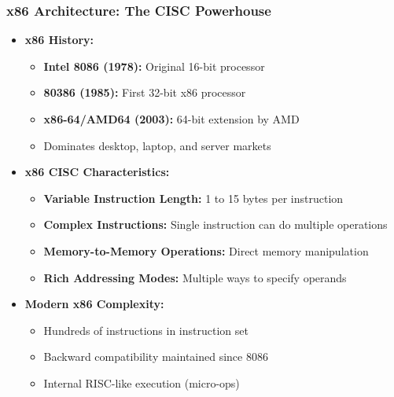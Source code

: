 \begin{frame}
\frametitle{x86 Architecture: The CISC Powerhouse}
\begin{itemize}
    \item \textbf{x86 History:}
    \begin{itemize}
        \item \textbf{Intel 8086 (1978):} Original 16-bit processor
        \item \textbf{80386 (1985):} First 32-bit x86 processor
        \item \textbf{x86-64/AMD64 (2003):} 64-bit extension by AMD
        \item Dominates desktop, laptop, and server markets
    \end{itemize}
    \item \textbf{x86 CISC Characteristics:}
    \begin{itemize}
        \item \textbf{Variable Instruction Length:} 1 to 15 bytes per instruction
        \item \textbf{Complex Instructions:} Single instruction can do multiple operations
        \item \textbf{Memory-to-Memory Operations:} Direct memory manipulation
        \item \textbf{Rich Addressing Modes:} Multiple ways to specify operands
    \end{itemize}
    \item \textbf{Modern x86 Complexity:}
    \begin{itemize}
        \item Hundreds of instructions in instruction set
        \item Backward compatibility maintained since 8086
        \item Internal RISC-like execution (micro-ops)
    \end{itemize}
\end{itemize}
\end{frame}

